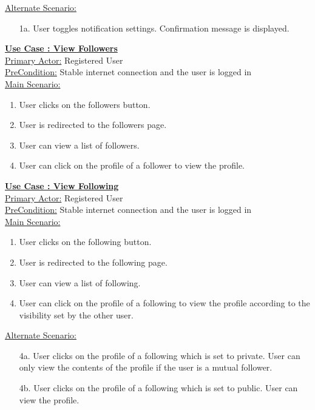 \documentclass[conference,compsoc]{IEEEtran}
\newcounter{UC}
\newcommand{\nextU}{\stepcounter{UC}\theUC}
\begin{document}
\underline{Alternate Scenario:}\\
\begin{enumerate}
    \item [1a.] User toggles notification settings. Confirmation message is displayed.
\end{enumerate}\vspace{0.2cm}

\underline{\textbf{Use Case \nextU: View Followers}}\\

\underline{Primary Actor:} Registered User\\

\underline{PreCondition:} Stable internet connection and the user is logged in\\

\underline{Main Scenario:}\\
\begin{enumerate}
    \item User clicks on the followers button.
    \item User is redirected to the followers page.
    \item User can view a list of followers.
    \item User can click on the profile of a follower to view the profile.
\end{enumerate}

\underline{\textbf{Use Case \nextU: View Following}}\\

\underline{Primary Actor:} Registered User\\

\underline{PreCondition:} Stable internet connection and the user is logged in\\

\underline{Main Scenario:}\\
\begin{enumerate}
    \item User clicks on the following button.
    \item User is redirected to the following page.
    \item User can view a list of following.
    \item User can click on the profile of a following to view the profile according to the visibility set by the other user.
\end{enumerate}

\underline{Alternate Scenario:}\\
\begin{enumerate}
    \item [4a.] User clicks on the profile of a following which is set to private. User can only view the contents of the profile if the user is a mutual follower.
    \item [4b.] User clicks on the profile of a following which is set to public. User can view the profile.
\end{enumerate}\vspace{0.2cm}
\end{document}
